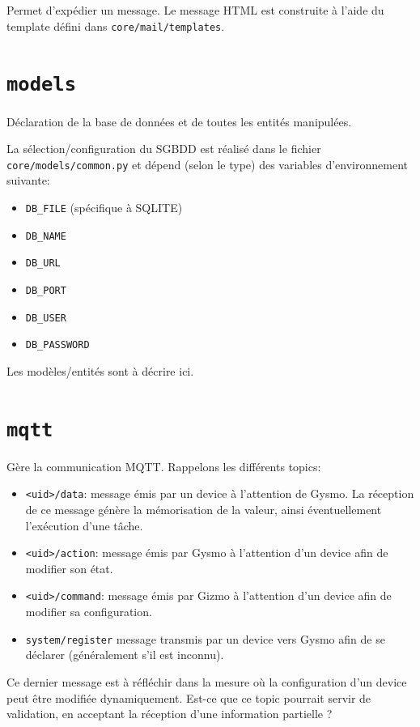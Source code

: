 Permet d'expédier un message. Le message HTML est construite à l'aide du template défini dans \lstinline|core/mail/templates|.


\section{\lstinline|models|}

Déclaration de la base de données et de toutes les entités manipulées.

La sélection/configuration du SGBDD est réalisé dans le fichier \lstinline|core/models/common.py| et dépend (selon le type) des variables d'environnement suivante:
%
\begin{itemize}
	\item \lstinline|DB_FILE| (spécifique à SQLITE)
	\item \lstinline|DB_NAME|
	\item \lstinline|DB_URL|
	\item \lstinline|DB_PORT|
	\item \lstinline|DB_USER|
	\item \lstinline|DB_PASSWORD|
\end{itemize}


Les modèles/entités sont à décrire ici.

\section{\lstinline|mqtt|}

Gère la communication MQTT. Rappelons les différents topics:
\begin{itemize}
	\item \lstinline|<uid>/data|: message émis par un device à l'attention de Gysmo. La réception de ce message génère la mémorisation de la valeur, ainsi éventuellement l'exécution d'une tâche.
	\item \lstinline|<uid>/action|: message émis par Gysmo à l'attention d'un device afin de modifier son état.
	\item \lstinline|<uid>/command|: message émis par Gizmo à l'attention d'un device afin de modifier sa configuration.
	\item \lstinline|system/register| message transmis par un device vers Gysmo afin de se déclarer (généralement s'il est inconnu).
\end{itemize}

{\color{red}Ce dernier message est à réfléchir dans la mesure où la configuration d'un device peut être modifiée dynamiquement. Est-ce que ce topic pourrait servir de validation, en acceptant la réception d'une information partielle ?}


